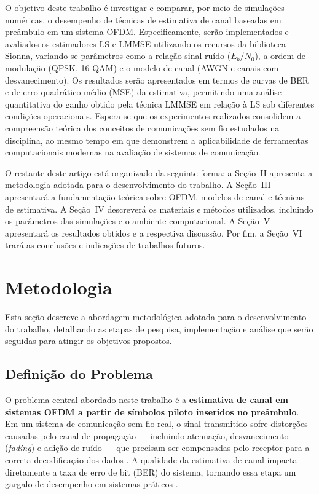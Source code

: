 \documentclass[conference]{IEEEtran}
\begin{document}
O objetivo deste trabalho é investigar e comparar, por meio de simulações numéricas, o desempenho de técnicas de estimativa de canal baseadas em preâmbulo em um sistema OFDM. Especificamente, serão implementados e avaliados os estimadores LS e LMMSE utilizando os recursos da biblioteca Sionna, variando-se parâmetros como a relação sinal-ruído ($E_b/N_0$), a ordem de modulação (QPSK, 16-QAM) e o modelo de canal (AWGN e canais com desvanecimento). Os resultados serão apresentados em termos de curvas de BER e de erro quadrático médio (MSE) da estimativa, permitindo uma análise quantitativa do ganho obtido pela técnica LMMSE em relação à LS sob diferentes condições operacionais. Espera-se que os experimentos realizados consolidem a compreensão teórica dos conceitos de comunicações sem fio estudados na disciplina, ao mesmo tempo em que demonstrem a aplicabilidade de ferramentas computacionais modernas na avaliação de sistemas de comunicação.

O restante deste artigo está organizado da seguinte forma: a Seção~II apresenta a metodologia adotada para o desenvolvimento do trabalho. A Seção~III apresentará a fundamentação teórica sobre OFDM, modelos de canal e técnicas de estimativa. A Seção~IV descreverá os materiais e métodos utilizados, incluindo os parâmetros das simulações e o ambiente computacional. A Seção~V apresentará os resultados obtidos e a respectiva discussão. Por fim, a Seção~VI trará as conclusões e indicações de trabalhos futuros.

\section{Metodologia}

Esta seção descreve a abordagem metodológica adotada para o desenvolvimento do trabalho, detalhando as etapas de pesquisa, implementação e análise que serão seguidas para atingir os objetivos propostos.

\subsection{Definição do Problema}

O problema central abordado neste trabalho é a \textbf{estimativa de canal em sistemas OFDM a partir de símbolos piloto inseridos no preâmbulo}. Em um sistema de comunicação sem fio real, o sinal transmitido sofre distorções causadas pelo canal de propagação --- incluindo atenuação, desvanecimento (\textit{fading}) e adição de ruído --- que precisam ser compensadas pelo receptor para a correta decodificação dos dados \cite{proakis2008, goldsmith2005}. A qualidade da estimativa de canal impacta diretamente a taxa de erro de bit (BER) do sistema, tornando essa etapa um gargalo de desempenho em sistemas práticos \cite{vanDeBeek1995}.
\end{document}
